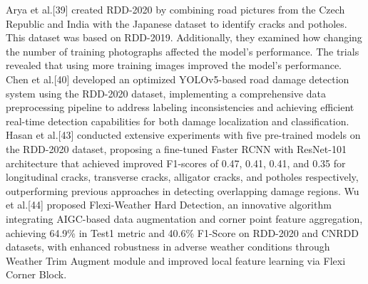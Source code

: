 \documentclass[sensors,article,submit,moreauthors]{Definitions/mdpi}
\begin{document}
    Arya et al.[39]\citep{arya2021rdd2020} created RDD-2020 by combining road pictures from the Czech Republic and India with the Japanese dataset to identify cracks and potholes. This dataset was based on RDD-2019. Additionally, they examined how changing the number of training photographs affected the model's performance. The trials revealed that using more training images improved the model's performance. Chen et al.[40]\citep{chen2023research} developed an optimized YOLOv5-based road damage detection system using the RDD-2020 dataset, implementing a comprehensive data preprocessing pipeline to address labeling inconsistencies and achieving efficient real-time detection capabilities for both damage localization and classification. Hasan et al.[43]\citep{hasan2022road} conducted extensive experiments with five pre-trained models on the RDD-2020 dataset, proposing a fine-tuned Faster RCNN with ResNet-101 architecture that achieved improved F1-scores of 0.47, 0.41, 0.41, and 0.35 for longitudinal cracks, transverse cracks, alligator cracks, and potholes respectively, outperforming previous approaches in detecting overlapping damage regions. Wu et al.[44]\citep{wu2024utilize} proposed Flexi-Weather Hard Detection, an innovative algorithm integrating AIGC-based data augmentation and corner point feature aggregation, achieving 64.9\% in Test1 metric and 40.6\% F1-Score on RDD-2020 and CNRDD datasets, with enhanced robustness in adverse weather conditions through Weather Trim Augment module and improved local feature learning via Flexi Corner Block.
\end{document}
